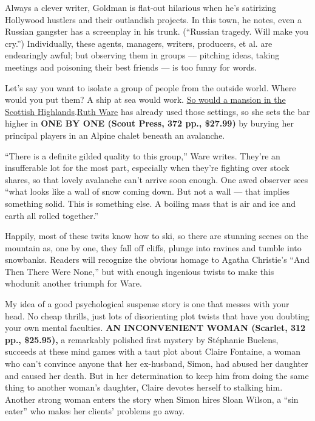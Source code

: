 Always a clever writer, Goldman is flat-out hilarious when he's
satirizing Hollywood hustlers and their outlandish projects. In this
town, he notes, even a Russian gangster has a screenplay in his trunk.
(``Russian tragedy. Will make you cry.'') Individually, these agents,
managers, writers, producers, et al. are endearingly awful; but
observing them in groups --- pitching ideas, taking meetings and
poisoning their best friends --- is too funny for words.

Let's say you want to isolate a group of people from the outside world.
Where would you put them? A ship at sea would work.
\href{https://www.nytimes3xbfgragh.onion/2019/07/17/books/review/the-whisper-man-alex-north-turn-of-the-key-ruth-ware-adrian-mckinty-chain.html}{So
would a mansion in the Scottish
Highlands}.\href{https://www.nytimes3xbfgragh.onion/2016/08/07/books/review/inside-the-list.html}{Ruth
Ware} has already used those settings, so she sets the bar higher in
\textbf{ONE BY ONE (Scout Press, 372 pp., \$27.99)} by burying her
principal players in an Alpine chalet beneath an avalanche.

``There is a definite gilded quality to this group,'' Ware writes.
They're an insufferable lot for the most part, especially when they're
fighting over stock shares, so that lovely avalanche can't arrive soon
enough. One awed observer sees ``what looks like a wall of snow coming
down. But not a wall --- that implies something solid. This is something
else. A boiling mass that is air and ice and earth all rolled
together.''

Happily, most of these twits know how to ski, so there are stunning
scenes on the mountain as, one by one, they fall off cliffs, plunge into
ravines and tumble into snowbanks. Readers will recognize the obvious
homage to Agatha Christie's ``And Then There Were None,'' but with
enough ingenious twists to make this whodunit another triumph for Ware.

My idea of a good psychological suspense story is one that messes with
your head. No cheap thrills, just lots of disorienting plot twists that
have you doubting your own mental faculties. \textbf{AN INCONVENIENT
WOMAN (Scarlet, 312 pp., \$25.95),} a remarkably polished first mystery
by Stéphanie Buelens, succeeds at these mind games with a taut plot
about Claire Fontaine, a woman who can't convince anyone that her
ex-husband, Simon, had abused her daughter and caused her death. But in
her determination to keep him from doing the same thing to another
woman's daughter, Claire devotes herself to stalking him. Another strong
woman enters the story when Simon hires Sloan Wilson, a ``sin eater''
who makes her clients' problems go away.

